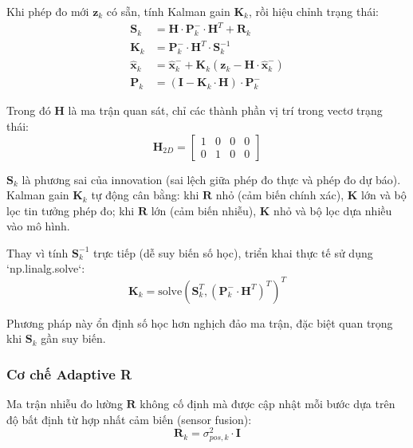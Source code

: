 Khi phép đo mới $\mathbf{z}_k$ có sẵn, tính Kalman gain $\mathbf{K}_k$, rồi hiệu chỉnh trạng thái:
\begin{equation}
\begin{aligned}
    \mathbf{S}_k &= \mathbf{H} \cdot \mathbf{P}_k^- \cdot \mathbf{H}^T + \mathbf{R}_k \\
    \mathbf{K}_k &= \mathbf{P}_k^- \cdot \mathbf{H}^T \cdot \mathbf{S}_k^{-1} \\
    \hat{\mathbf{x}}_k &= \hat{\mathbf{x}}_k^- + \mathbf{K}_k \left(\mathbf{z}_k - \mathbf{H} \cdot \hat{\mathbf{x}}_k^-\right) \\
    \mathbf{P}_k &= \left(\mathbf{I} - \mathbf{K}_k \cdot \mathbf{H}\right) \cdot \mathbf{P}_k^-
\end{aligned}
\end{equation}

Trong đó $\mathbf{H}$ là ma trận quan sát, chỉ các thành phần vị trí trong vectơ trạng thái:
\begin{equation}
    \mathbf{H}_{2D} = \begin{bmatrix} 1 & 0 & 0 & 0 \\ 0 & 1 & 0 & 0 \end{bmatrix}
\end{equation}

$\mathbf{S}_k$ là phương sai của innovation (sai lệch giữa phép đo thực và phép đo dự báo). Kalman gain $\mathbf{K}_k$ tự động cân bằng: khi $\mathbf{R}$ nhỏ (cảm biến chính xác), $\mathbf{K}$ lớn và bộ lọc tin tưởng phép đo; khi $\mathbf{R}$ lớn (cảm biến nhiễu), $\mathbf{K}$ nhỏ và bộ lọc dựa nhiều vào mô hình.

Thay vì tính $\mathbf{S}_k^{-1}$ trực tiếp (dễ suy biến số học), triển khai thực tế sử dụng `np.linalg.solve`:
\begin{equation}
    \mathbf{K}_k = \text{solve}\left(\mathbf{S}_k^T, \left(\mathbf{P}_k^- \cdot \mathbf{H}^T\right)^T\right)^T
\end{equation}

Phương pháp này ổn định số học hơn nghịch đảo ma trận, đặc biệt quan trọng khi $\mathbf{S}_k$ gần suy biến.

\subsubsection{Cơ chế Adaptive R}

\hspace{0.5cm} Ma trận nhiễu đo lường $\mathbf{R}$ không cố định mà được cập nhật mỗi bước dựa trên độ bất định từ hợp nhất cảm biến (sensor fusion):
\begin{equation}
    \mathbf{R}_k = \sigma_{pos,k}^2 \cdot \mathbf{I}
\end{equation}

